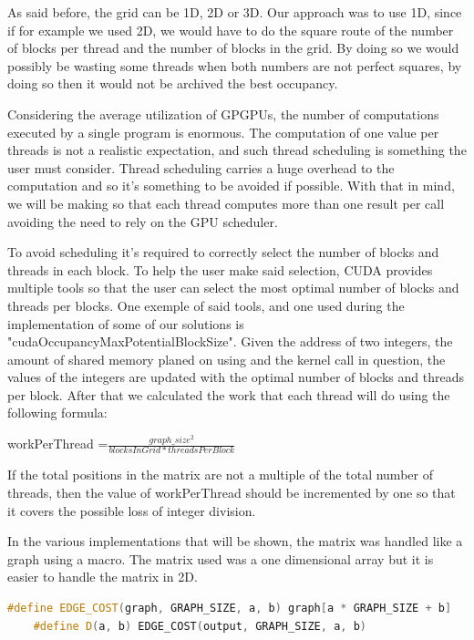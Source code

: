 \documentclass[conference]{IEEEtran}
\begin{document}
As said before, the grid can be 1D, 2D or 3D. Our approach was to use 1D, since if for example we used 2D, we would have to do the square route of the number of blocks per thread and the number of blocks in the grid. By doing so we would possibly be wasting some threads when both numbers are not perfect squares, by doing so then it would not be archived the best occupancy\cite{occupancy}.

Considering the average utilization of GPGPUs, the number of computations executed by a single program is enormous. The computation of one value per threads is not a realistic expectation, and such thread scheduling is something the user must consider. Thread scheduling carries a huge overhead to the computation and so it's something to be avoided if possible. With that in mind, we will be making so that each thread computes more than one result per call avoiding the need to rely on the GPU scheduler. 

To avoid scheduling it's required to correctly select the number of blocks and threads in each block. To help the user make said selection, CUDA provides multiple tools so that the user can select the most optimal number of blocks and threads per blocks. One exemple of said tools, and one used during the implementation of some of our solutions is "cudaOccupancyMaxPotentialBlockSize". Given the address of two integers, the amount of shared memory planed on using and the kernel call in question, the values of the integers are updated with the optimal number of blocks and threads per block. After that we calculated the work that each thread will do using the following formula:
\newline\newline
\centerline{workPerThread =$\frac{graph\_size^2}{blocksInGrid*threadsPerBlock}$}
\newline\newline
If the total positions in the matrix are not a multiple of the total number of threads, then the value of workPerThread should be incremented by one so that it covers the possible loss of integer division.

In the various implementations that will be shown, the matrix was handled like a graph using a macro. The matrix used was a one dimensional array but it is easier to handle the matrix in 2D.

\begin{lstlisting}[language=C++, caption=Macros used]
	#define EDGE_COST(graph, GRAPH_SIZE, a, b) graph[a * GRAPH_SIZE + b]
	#define D(a, b) EDGE_COST(output, GRAPH_SIZE, a, b)
\end{lstlisting}
\end{document}
